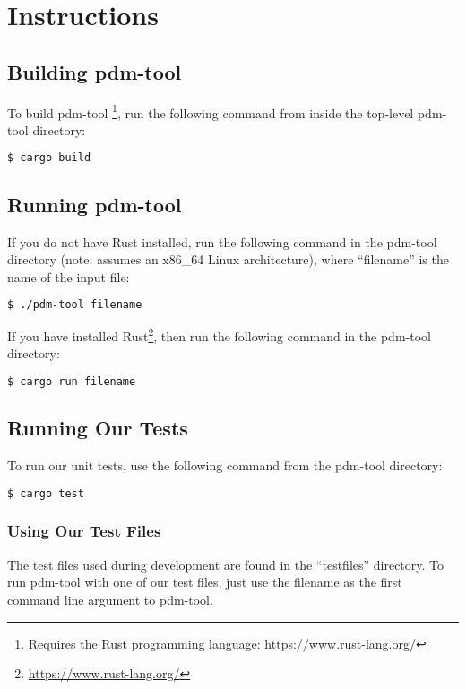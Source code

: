 \chapter{Instructions}

\section{Building pdm-tool}

To build pdm-tool
\footnote{Requires the Rust programming language: \url{https://www.rust-lang.org/}},
run the following command from inside the top-level pdm-tool directory:

\begin{lstlisting}[language=bash,frame=single,showstringspaces=false]
$ cargo build
\end{lstlisting}

\section{Running pdm-tool}

If you do not have Rust installed, run the following command in the
pdm-tool directory (note: assumes an x86\_64 Linux architecture), where
``filename'' is the name of the input file:

\begin{lstlisting}[language=bash,frame=single,showstringspaces=false]
$ ./pdm-tool filename
\end{lstlisting}

If you have installed Rust\footnote{\url{https://www.rust-lang.org/}},
then run the following command in the pdm-tool directory:

\begin{lstlisting}[language=bash,frame=single,showstringspaces=false]
$ cargo run filename
\end{lstlisting}

\section{Running Our Tests}

To run our unit tests, use the following command from the pdm-tool
directory:

\begin{lstlisting}[language=bash,frame=single,showstringspaces=false]
$ cargo test
\end{lstlisting}

\subsection{Using Our Test Files}

The test files used during development are found in the ``testfiles''
directory. To run pdm-tool with one of our test files, just use the
filename as the first command line argument to pdm-tool.
